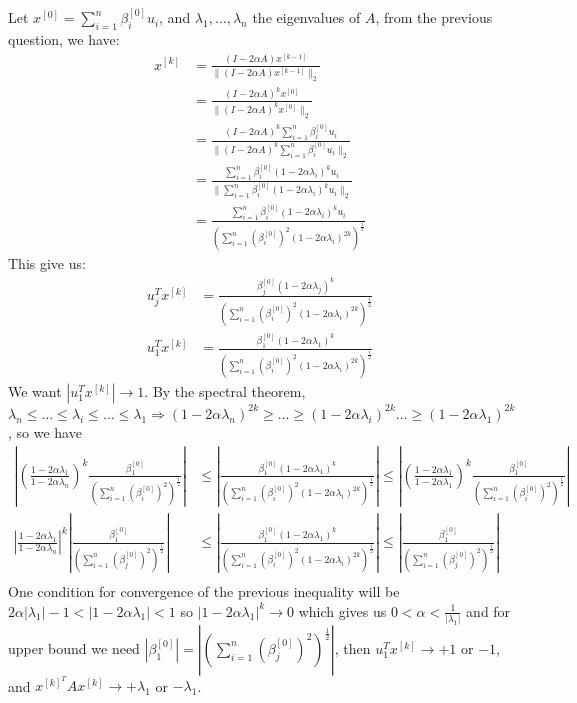 \documentclass[12pt,twoside]{article}
\begin{document}
\begin{enumerate}
\begin{enumerate}
Let $x^{[0]} = \sum_{i=1}^n \beta_i^{[0]} u_i$,  and $\lambda_1, \dots , \lambda_n$ the eigenvalues of $A$, from the previous question, we have:
\begin{align*}
	x^{[k]}	&=	\frac{(I - 2 \alpha A)  x^{[k-1]}} { \| (I - 2 \alpha A)  x^{[k-1]} \|_2} \\
			&=	\frac{(I - 2 \alpha A)^k x^{[0]}} { \| (I - 2 \alpha A)^k x^{[0]} \|_2 } \\
			&= 	\frac{(I - 2 \alpha A)^k \sum_{i=1}^n \beta_i^{[0]} u_i} { \| (I - 2 \alpha A)^k \sum_{i=1}^n \beta_i^{[0]} u_i \|_2} \\
			&=	\frac{\sum_{i=1}^n \beta_i^{[0]} (1 - 2 \alpha \lambda_i)^k u_i} { \| \sum_{i=1}^n \beta_i^{[0]} (1 - 2 \alpha \lambda_i)^k u_i \|_2} \\
			&= 	\frac{\sum_{i=1}^n \beta_i^{[0]} (1 - 2 \alpha \lambda_i)^k u_i} { (\sum_{i=1}^n (\beta_i^{[0]})^2 (1 - 2 \alpha \lambda_i)^{2k} )^{\frac{1}{2}} }
\end{align*}
This give us:
\begin{align*}
	u_j^T x^{[k]}	&=	\frac{ \beta_j^{[0]} (1 - 2 \alpha \lambda_j)^k }  { (\sum_{i=1}^n (\beta_i^{[0]})^2 (1 - 2 \alpha \lambda_i)^{2k} )^{\frac{1}{2}} } \\
	u_1^T x^{[k]}	&=	\frac{ \beta_1^{[0]} (1 - 2 \alpha \lambda_1)^k }  { (\sum_{i=1}^n (\beta_i^{[0]})^2 (1 - 2 \alpha \lambda_i)^{2k} )^{\frac{1}{2}} } 
\end{align*}
We want $|u_1^T x^{[k]}| \to 1$.
By the spectral theorem, $\lambda_n \le \dots \le \lambda_i \le \ldots \le \lambda_1 \Rightarrow (1-2 \alpha \lambda_n)^{2k} \ge \ldots \ge (1-2 \alpha \lambda_i)^{2k} \ldots \ge (1-2 \alpha \lambda_1)^{2k}$, so we have
\begin{align*}
	|(\frac{1-2 \alpha \lambda_1}{1-2 \alpha \lambda_n})^k \frac{\beta_1^{[0]}} {(\sum_{i=1}^n (\beta_i^{[0]})^2)^{\frac{1}{2}}}| 
		&\le |\frac{ \beta_1^{[0]} (1 - 2 \alpha \lambda_1)^k }  { (\sum_{i=1}^n (\beta_i^{[0]})^2 (1 - 2 \alpha \lambda_i)^{2k} )^{\frac{1}{2}} }|
		\le |(\frac{1-2 \alpha \lambda_1}{1-2 \alpha \lambda_1})^k \frac{\beta_1^{[0]}} {(\sum_{i=1}^n (\beta_i^{[0]})^2)^{\frac{1}{2}}}| \\
	|\frac{1-2 \alpha \lambda_1}{1-2 \alpha \lambda_n}|^k |\frac{\beta_1^{[0]}} {(\sum_{i=1}^n (\beta_j^{[0]})^2)^{\frac{1}{2}}} |
		&\le |\frac{ \beta_1^{[0]} (1 - 2 \alpha \lambda_1)^k }  { (\sum_{i=1}^n (\beta_i^{[0]})^2 (1 - 2 \alpha \lambda_i)^{2k} )^{\frac{1}{2}} }| 
		\le | \frac{\beta_1^{[0]}} {(\sum_{i=1}^n (\beta_j^{[0]})^2)^{\frac{1}{2}}}| \\
\end{align*}
One condition for convergence of the previous inequality will be  $2 \alpha |\lambda_1| - 1 <  |1 - 2 \alpha \lambda_1| < 1$ so $|1 - 2 \alpha \lambda_1|^k \to 0$ which gives us $0 < \alpha < \frac{1}{|\lambda_1|}$ and for upper bound we need  $|\beta_1^{[0]}| =| (\sum_{i=1}^n (\beta_j^{[0]})^2)^{\frac{1}{2}}|$,
then $u_1^T x^{[k]}  \to +1$ or $-1$, and $x^{[k]^T} A x^{[k]} \to +\lambda_1$ or $-\lambda_1$.


\end{enumerate}
\end{enumerate}
\end{document}
